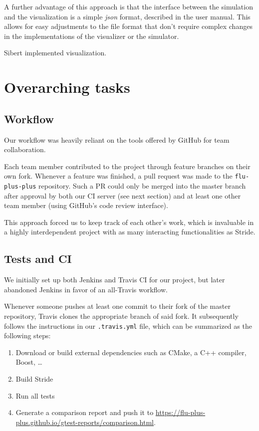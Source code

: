 \documentclass[a4paper,12pt]{article}
\begin{document}
A further advantage of this approach is that the interface between the simulation and the visualization is a simple \textit{json} format, described in the user manual. This allows for easy adjustments to the file format that don't require complex changes in the implementations of the visualizer or the simulator.

Sibert implemented visualization.

\section{Overarching tasks}
\subsection{Workflow} %
Our workflow was heavily reliant on the tools offered by GitHub for team collaboration.

Each team member contributed to the project through feature branches on their own fork. Whenever a feature was finished, a pull request was made to the \texttt{flu-plus-plus} repository. Such a PR could only be merged into the master branch after approval by both our CI server (see next section) and at least one other team member (using GitHub's code review interface).

This approach forced us to keep track of each other's work, which is invaluable in a highly interdependent project with as many interacting functionalities as Stride.

\subsection{Tests and CI} %

We initially set up both Jenkins and Travis CI for our project, but later abandoned Jenkins in favor of an all-Travis workflow.

Whenever someone pushes at least one commit to their fork of the master repository, Travis clones the appropriate branch of said fork. It subsequently follows the instructions in our \texttt{.travis.yml} file, which can be summarized as the following steps:

\begin{enumerate}
	\item Download or build external dependencies such as CMake, a C++ compiler, Boost, \dots
	\item Build Stride
	\item Run all tests
	\item Generate a comparison report and push it to \url{https://flu-plus-plus.github.io/gtest-reports/comparison.html}.
\end{enumerate}
\end{document}
